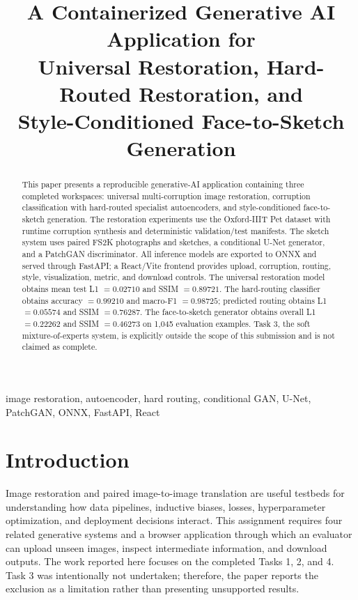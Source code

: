 \documentclass[conference]{IEEEtran}
\title{A Containerized Generative AI Application for\\
Universal Restoration, Hard-Routed Restoration, and\\
Style-Conditioned Face-to-Sketch Generation}
\author{\IEEEauthorblockN{Akif Jawad}\IEEEauthorblockA{Generative AI Assignment 1\\FAST Islamabad\\\url{https://github.com/AKIF-jk/Generative_AI}}}
\begin{document}
\maketitle

\begin{abstract}
\normalfont
This paper presents a reproducible generative-AI application containing three completed workspaces: universal multi-corruption image restoration, corruption classification with hard-routed specialist autoencoders, and style-conditioned face-to-sketch generation. The restoration experiments use the Oxford-IIIT Pet dataset with runtime corruption synthesis and deterministic validation/test manifests. The sketch system uses paired FS2K photographs and sketches, a conditional U-Net generator, and a PatchGAN discriminator. All inference models are exported to ONNX and served through FastAPI; a React/Vite frontend provides upload, corruption, routing, style, visualization, metric, and download controls. The universal restoration model obtains mean test L1 $=0.02710$ and SSIM $=0.89721$. The hard-routing classifier obtains accuracy $=0.99210$ and macro-F1 $=0.98725$; predicted routing obtains L1 $=0.05574$ and SSIM $=0.76287$. The face-to-sketch generator obtains overall L1 $=0.22262$ and SSIM $=0.46273$ on 1,045 evaluation examples. Task 3, the soft mixture-of-experts system, is explicitly outside the scope of this submission and is not claimed as complete.
\end{abstract}

\begin{IEEEkeywords}
image restoration, autoencoder, hard routing, conditional GAN, U-Net, PatchGAN, ONNX, FastAPI, React
\end{IEEEkeywords}

\section{Introduction}
Image restoration and paired image-to-image translation are useful testbeds for understanding how data pipelines, inductive biases, losses, hyperparameter optimization, and deployment decisions interact. This assignment requires four related generative systems and a browser application through which an evaluator can upload unseen images, inspect intermediate information, and download outputs. The work reported here focuses on the completed Tasks 1, 2, and 4. Task 3 was intentionally not undertaken; therefore, the paper reports the exclusion as a limitation rather than presenting unsupported results.
\end{document}
